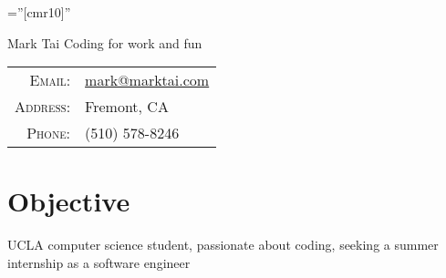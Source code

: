 \documentclass[a4paper,10pt]{article}
\begin{document}

\pagestyle{empty} %

\font\fb=''[cmr10]'' %



\begin{minipage}{0.7\textwidth}%
\par{
	{\fontsize{40}{50}\selectfont Mark Tai}
	\Large \hspace{.2em} Coding for work and fun
    }
\end{minipage}%
\hfill%
\begin{minipage}{0.3\textwidth}
\begin{tabular}{r|l}
    \textsc{Email:}     & \href{mailto:mark@marktai.com}{mark@marktai.com} \\
    \textsc{Address:}   & Fremont, CA \\
    \textsc{Phone:}     & (510) 578-8246\\
\end{tabular}
\end{minipage}

\section{Objective}
UCLA computer science student, passionate about coding, seeking a summer internship as a software engineer
\end{document}

